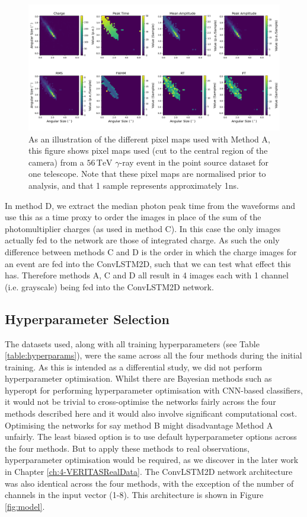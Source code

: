 \begin{figure}[ht]
  \centering
  \includegraphics[width=\textwidth]{figures/56tgamma.png}
  \caption{As an illustration of the different pixel maps used with Method A, this figure shows pixel maps used (cut to the central region of the camera) from a $\mathrm{56\,TeV}$ $\gamma$-ray event in the point source dataset for one telescope. Note that these pixel maps are normalised prior to analysis, and that 1 sample represents approximately 1ns.}
  \label{fig:wfplot}
\end{figure}
In method D, we extract the median photon peak time from the waveforms and use this as a time proxy to order the images in place of the sum of the photomultiplier charges (as used in method C). In this case the only images actually fed to the network are those of integrated charge. As such the only difference between methods C and D is the order in which the charge images for an event are fed into the ConvLSTM2D, such that we can test what effect this has. Therefore methods A, C and D all result in 4 images each with 1 channel (i.e. grayscale) being fed into the ConvLSTM2D network.

\subsection{Hyperparameter Selection}
The datasets used, along with all training hyperparameters (see Table \ref{table:hyperparams}), were the same across all the four methods during the initial training. As this is intended as a differential study, we did not perform hyperparameter optimisation. Whilst there are Bayesian methods such as hyperopt \cite{hyperopt} for performing hyperparameter optimisation with CNN-based classifiers, it would not be trivial to cross-optimise the networks fairly across the four methods described here and it would also involve significant computational cost. Optimising the networks for say method B might disadvantage Method A unfairly. The least biased option is to use default hyperparameter options across the four methods. But to apply these methods to real observations, hyperparameter optimisation would be required, as we discover in the later work in Chapter \ref{ch:4-VERITASRealData}. The ConvLSTM2D network architecture was also identical across the four methods, with the exception of the number of channels in the input vector (1-8).  This architecture is shown in Figure \ref{fig:model}.

